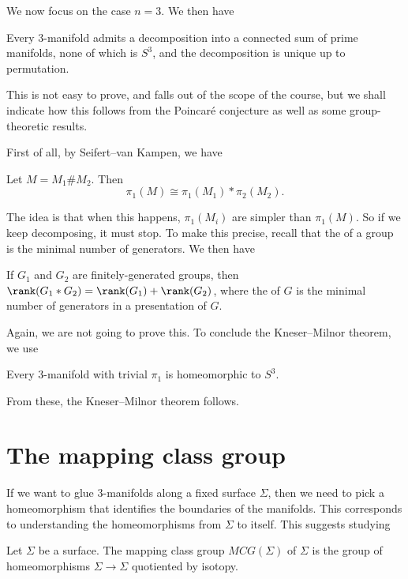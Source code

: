 \documentclass[a4paper]{article}
\begin{document}
We now focus on the case $n = 3$. We then have
\begin{thm}
  Every $3$-manifold admits a decomposition into a connected sum of prime manifolds, none of which is $S^3$, and the decomposition is unique up to permutation.
\end{thm}

This is not easy to prove, and falls out of the scope of the course, but we shall indicate how this follows from the Poincar\'e conjecture as well as some group-theoretic results.

First of all, by Seifert--van Kampen, we have
\begin{prop}
  Let $M = M_1 \# M_2$. Then
  \[
    \pi_1(M) \cong \pi_1(M_1) * \pi_2(M_2).
  \]
\end{prop}
The idea is that when this happens, $\pi_1(M_i)$ are simpler than $\pi_1(M)$. So if we keep decomposing, it must stop. To make this precise, recall that the  of a group is the minimal number of generators. We then have

\begin{thm}
  If $G_1$ and $G_2$ are finitely-generated groups, then $\rank(G_1 * G_2) = \rank(G_1) + \rank(G_2)$, where the  of $G$ is the minimal number of generators in a presentation of $G$.
\end{thm}

Again, we are not going to prove this. To conclude the Kneser--Milnor theorem, we use
\begin{thm}
  Every $3$-manifold with trivial $\pi_1$ is homeomorphic to $S^3$.
\end{thm}

From these, the Kneser--Milnor theorem follows.

\section{The mapping class group}
If we want to glue $3$-manifolds along a fixed surface $\Sigma$, then we need to pick a homeomorphism that identifies the boundaries of the manifolds. This corresponds to understanding the homeomorphisms from $\Sigma$ to itself. This suggests studying
\begin{defi}
  Let $\Sigma$ be a surface. The mapping class group $MCG(\Sigma)$ of $\Sigma$ is the group of homeomorphisms $\Sigma \to \Sigma$ quotiented by isotopy.
\end{defi}
\end{document}
